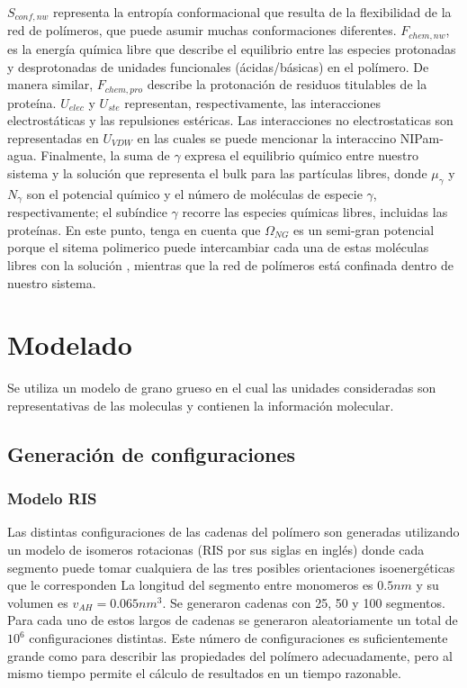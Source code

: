 $S_{conf,nw}$ representa la entropía conformacional que resulta de la flexibilidad de la red de polímeros, que puede asumir muchas conformaciones diferentes.
$F_{chem,nw}$, es la energía química libre que describe el equilibrio entre las especies protonadas y desprotonadas de unidades funcionales (ácidas/básicas) en el polímero.
De manera similar, $F_{chem,pro}$ describe la protonación de residuos titulables de la proteína.
$U_{elec}$ y $U_{ste}$ representan, respectivamente, las interacciones electrostáticas y las repulsiones estéricas.
Las interacciones no electrostaticas son representadas en $U_{VDW}$ en las cuales se puede mencionar la interaccino NIPam-agua.
Finalmente, la suma de $\gamma$ expresa el equilibrio químico entre nuestro sistema y la solución  que representa el bulk para las partículas libres, donde $\mu_\gamma$ y $N_\gamma$ son el potencial químico y el número de moléculas de especie $\gamma$, respectivamente;
el subíndice $\gamma$ recorre las especies químicas libres, incluidas las proteínas.
En este punto, tenga en cuenta que $\Omega_{NG}$ es un semi-gran potencial porque el sitema polimerico puede intercambiar cada una de estas moléculas libres con la solución , mientras que la red de polímeros está confinada dentro de nuestro sistema.


\section{Modelado}

Se utiliza un modelo de grano grueso en el cual las unidades consideradas son representativas de las moleculas y contienen la informaci\'on molecular.

\subsection{Generaci\'on de configuraciones}

\subsubsection{Modelo RIS}
Las distintas configuraciones de las cadenas del polímero son generadas utilizando un modelo de isomeros rotacionas (RIS por sus siglas en inglés) donde cada segmento puede tomar cualquiera de las tres posibles orientaciones isoenergéticas que le corresponden \addcite[Flory]
La longitud del segmento entre monomeros es $0.5 nm$ y su volumen es $v_{AH}= 0.065 nm^3$. Se generaron cadenas con 25, 50 y 100 segmentos. Para cada uno de estos largos de cadenas se generaron aleatoriamente un total de $10^6$ configuraciones distintas. Este número de configuraciones es suficientemente grande como para describir las propiedades del polímero adecuadamente, pero al mismo tiempo permite el cálculo de resultados en un tiempo razonable.

